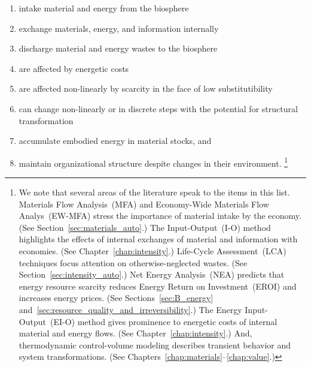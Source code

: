 \begin{enumerate}
	\item{\label{itm:intake}intake material and energy from the biosphere}
	\item{\label{itm:internal_exchange}exchange materials, energy, and information internally}
	\item{\label{itm:discharge}discharge material and energy wastes to the biosphere}
	\item{\label{itm:energetic_costs}are affected by energetic costs}
	\item{\label{itm:scarcity}are affected non-linearly by scarcity 
			in the face of low substitutibility}
	\item{\label{itm:non-linear}can change non-linearly or in discrete steps with the potential 
			for structural transformation}
	\item{\label{itm:embodies}accumulate embodied energy in material stocks, and}
	\item{\label{itm:robust}maintain organizational structure despite changes 
			in their environment.%
				\footnote{We note that 
				several areas of the literature speak to the items in this list.
				Materials Flow Analysis~(MFA) and 
				Economy-Wide Materials Flow Analys~(EW-MFA)
				stress the importance of
				material intake by the economy. 
				(See Section~\ref{sec:materials_auto}.)
				The Input-Output~(I-O) method highlights the effects of internal exchanges
				of material and information with economies. 
				(See Chapter~\ref{chap:intensity}.)
				Life-Cycle Assessment~(LCA) techniques focus attention 
				on otherwise-neglected wastes. 
				(See Section~\ref{sec:intensity_auto}.)
				Net Energy Analysis~(NEA) predicts that energy resource 
				scarcity reduces Energy Return on Investment~(EROI)
				and increases energy prices.
				(See Sections~\ref{sec:B_energy} 
				and~\ref{sec:resource_quality_and_irreversibility}.)
				The Energy Input-Output~(EI-O) method gives prominence to energetic costs
				of internal material and energy flows.
				(See Chapter~\ref{chap:intensity}.)
				And, thermodynamic control-volume modeling describes
				transient behavior and system transformations.
				(See Chapters~\ref{chap:materials}--\ref{chap:value}.)
			}}
\end{enumerate}

